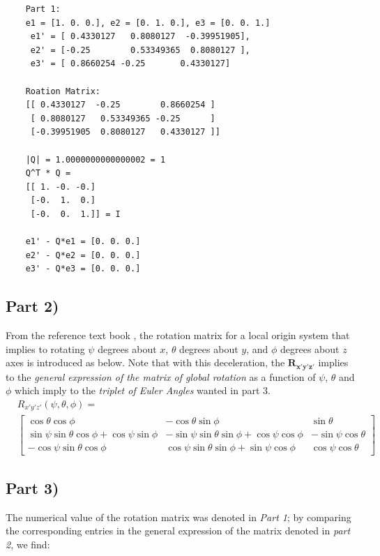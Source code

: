 \documentclass[conference]{IEEEtran}
\begin{document}
\scriptsize
\begin{verbatim}
    Part 1:
    e1 = [1. 0. 0.], e2 = [0. 1. 0.], e3 = [0. 0. 1.]
     e1' = [ 0.4330127   0.8080127  -0.39951905],
     e2' = [-0.25        0.53349365  0.8080127 ],
     e3' = [ 0.8660254 -0.25       0.4330127]

    Roation Matrix:
    [[ 0.4330127  -0.25        0.8660254 ]
     [ 0.8080127   0.53349365 -0.25      ]
     [-0.39951905  0.8080127   0.4330127 ]]

    |Q| = 1.0000000000000002 = 1
    Q^T * Q =
    [[ 1. -0. -0.]
     [-0.  1.  0.]
     [-0.  0.  1.]] = I

    e1' - Q*e1 = [0. 0. 0.]
    e2' - Q*e2 = [0. 0. 0.]
    e3' - Q*e3 = [0. 0. 0.]
\end{verbatim}
    

\subsection*{Part 2)}
From the reference text book \cite{b12}, the rotation matrix for a local origin system that implies to rotating $\psi$ degrees about $x$, $\theta$ degrees about $y$, and $\phi$ degrees about $z$ axes is introduced as below. Note that with this deceleration, the $\mathbf{R_{x'y'z'}}$ implies to the \textit{general expression of the matrix of global rotation} as a function of $\psi$, $\theta$ and $\phi$ which imply to the \textit{triplet of Euler Angles} wanted in part 3.
\begin{align}
    &R_{x'y'z'}(\psi, \theta, \phi) = \\
    &\begin{bmatrix}
        \cos \theta \cos \phi & - \cos \theta \sin \phi & \sin \theta \\
        \sin \psi \sin \theta \cos \phi + \cos \psi \sin \phi & - \sin \psi \sin \theta \sin \phi + \cos \psi \cos \phi & -\sin \psi \cos \theta \\
        -\cos \psi \sin \theta \cos \phi & \cos \psi \sin \theta \sin \phi + \sin \psi \cos \phi & \cos \psi \cos \theta \nonumber
    \end{bmatrix}
\end{align}

\subsection*{Part 3)}
The numerical value of the rotation matrix was denoted in \textit{Part 1}; by comparing the corresponding entries in the general expression of the matrix denoted in \textit{part 2}, we find:
\end{document}
